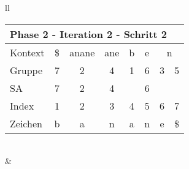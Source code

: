 \begin{table}[H]
\begin{adjustbox}{max width=\textwidth}
\begin{tabular}{ll}
\begin{tabular}{lccccccc}
\multicolumn{8}{l}{Phase 2 - Iteration 2 - Schritt 2}                                                                                                                                                             \\ \hline
\multicolumn{1}{l|}{Kontext} & \multicolumn{1}{c|}{\$} & \multicolumn{1}{c|}{\cellcolor[HTML]{\green}anane} & \multicolumn{1}{c|}{ane} & \multicolumn{1}{c|}{b} & \multicolumn{1}{c|}{e} & \multicolumn{2}{c}{n} \\
\multicolumn{1}{l|}{Gruppe}  & \multicolumn{1}{c|}{7}  & \multicolumn{1}{c|}{\cellcolor[HTML]{\green}2}     & \multicolumn{1}{c|}{4}   & \multicolumn{1}{c|}{1} & \multicolumn{1}{c|}{6} & 3         & 5          \\
\multicolumn{1}{l|}{SA}      & \multicolumn{1}{c|}{7}  & \multicolumn{1}{c|}{\cellcolor[HTML]{\green}2}     & \multicolumn{1}{c|}{4}   & \multicolumn{1}{c|}{}  & \multicolumn{1}{c|}{6} &           &            \\ \hline
\multicolumn{1}{l|}{Index}   & 1                       & \cellcolor[HTML]{\green}2                          & 3                        & 4                      & 5                      & 6         & 7          \\
\multicolumn{1}{l|}{Zeichen} & b                       & \cellcolor[HTML]{\green}a                          & n                        & a                      & n                      & e         & \$        
\end{tabular}

\\
&
\\


\end{tabular}
\end{adjustbox}
\end{table}
